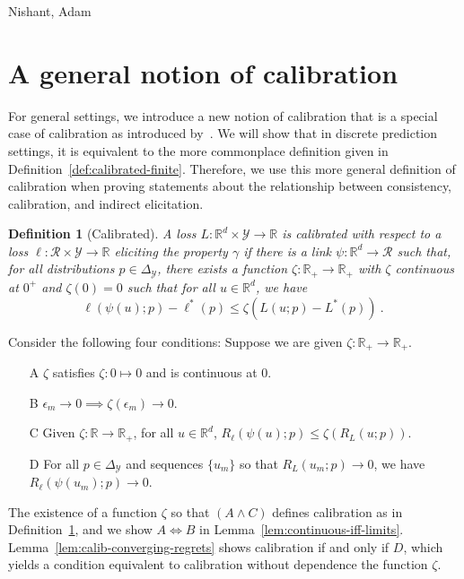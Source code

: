 \documentclass{article}
\newcommand{\reals}{\mathbb{R}}
\newcommand{\simplex}{\Delta_\Y}
\newcommand{\R}{\mathcal{R}}
\newcommand{\Y}{\mathcal{Y}}
\newcommand{\risk}[1]{#1^*}
\newtheorem{definition}{Definition}
\begin{document}
\begin{ack}
Nishant, Adam
\end{ack}




\newpage
\appendix
\section{A general notion of calibration}\label{app:calibration}
For general settings, we introduce a new notion of calibration that is a special case of calibration as introduced by~\citet[Chapter 3]{steinwart2008support}.
We will show that in discrete prediction settings, it is equivalent to the more commonplace definition given in Definition~\ref{def:calibrated-finite}.
Therefore, we use this more general definition of calibration when proving statements about the relationship between consistency, calibration, and indirect elicitation.

\begin{definition}[Calibrated]\label{def:calibrated-general}
	A loss $L:\reals^d \times \Y \to \reals$ is \emph{calibrated} with respect to a loss $\ell : \R \times \Y \to \reals$ eliciting the property $\gamma$ if there is a link $\psi : \reals^d \to \R$ such that, for all distributions $p \in \simplex$, there exists a function $\zeta : \reals_+ \to \reals_+$ with $\zeta$ continuous at $0^+$ and $\zeta(0) = 0$ such that for all $u \in \reals^d$, we have
	\begin{equation}\label{eq:calibrated-general}
	\ell( \psi(u); p) - \risk{\ell}(p)  \leq \zeta \left(  L(u;p) - \risk{L}(p) \right)~.~
	\end{equation}
\end{definition}

Consider the following four conditions: Suppose we are given $\zeta:\reals_+ \to \reals_+$.
\begin{enumerate}
	\item [A] $\zeta$ satisfies $\zeta : 0 \mapsto 0$ and is continuous at $0$.
	\item [B] $\epsilon_m \to 0 \implies \zeta(\epsilon_m) \to 0$.
	\item [C] Given $\zeta:\reals \to \reals_+$, for all $u \in \reals^d$, $R_\ell(\psi(u); p) \leq \zeta(R_L(u;p))$.
	\item [D] For all $p \in \simplex$ and sequences $\{u_m\}$ so that $R_L(u_m; p) \to 0$, we have $R_\ell(\psi(u_m); p) \to 0$.
\end{enumerate}
The existence of a function $\zeta$ so that $(A \wedge C)$ defines calibration as in Definition~\ref{def:calibrated-general}, and we show $A \iff B$ in Lemma~\ref{lem:continuous-iff-limits}.  
Lemma~\ref{lem:calib-converging-regrets} shows calibration if and only if $D$, which yields a condition equivalent to calibration without dependence the function $\zeta$.
\end{document}

